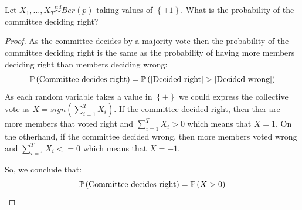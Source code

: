 \begin{exercise}
	Let $X_1,\ldots,X_T\overset{iid}{\sim}Ber\left(p\right)$ taking values of $\left\{\pm1\right\}$. What is the probability of the committee deciding right?
\end{exercise}
\begin{proof}
As the committee decides by a majority vote then the probability of the committee deciding right is the same as the probability of having more members deciding right than members deciding wrong: $$ \Prob\left(\text{Committee decides right}\right)=\Prob\left(\left|\text{Decided right}\right|>\left|\text{Decided wrong}\right|\right) $$
As each random variable takes a value in $\left\{\pm\right\}$ we could express the collective vote as $X=sign\left(\sum_{i=1}^TX_i\right)$. If the committee decided right, then ther are more members that voted right and $\sum_{i=1}^TX_i>0$ which means that $X=1$. On the otherhand, if the committee decided wrong, then more members voted wrong and $\sum_{i=1}^TX_i<=0$ which means that $X=-1$.

So, we conclude that: $$ \mathbb{P}\left(\text{Committee decides right}\right)=\mathbb{P}\left(X>0\right) $$
\end{proof}

